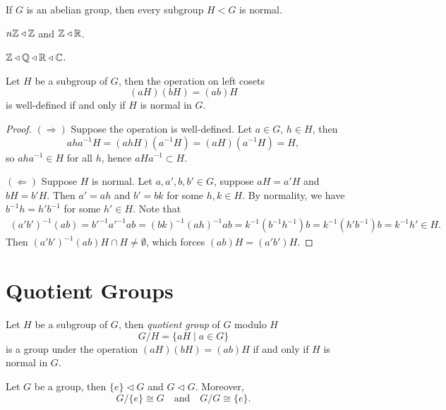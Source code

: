 \begin{proposition}
  If \(G\) is an abelian group, then every subgroup \(H < G\) is normal.
\end{proposition}

\begin{example}
  \(n\mathbb{Z}\triangleleft\mathbb{Z}\) and \(\mathbb{Z}\triangleleft\mathbb{R}\).
\end{example}

\begin{example}
  \(\mathbb{Z}\triangleleft\mathbb{Q}\triangleleft\mathbb{R}\triangleleft\mathbb{C}\).
\end{example}

\begin{theorem}
  Let \(H\) be a subgroup of \(G\), then the operation on left cosets \[
    (aH)(bH) = (ab)H
  \] is well-defined if and only if \(H\) is normal in \(G\).
\end{theorem}
\begin{proof}
  \((\Rightarrow)\) Suppose the operation is well-defined. Let \(a\in G\), \(h\in H\), then \[
    aha^{-1}H = (ahH)(a^{-1}H)
    = (aH)(a^{-1}H) = H,
  \] so \(aha^{-1}\in H\) for all \(h\), hence \(aHa^{-1}\subset H\).

  \((\Leftarrow)\) Suppose \(H\) is normal. Let \(a,a',b,b'\in G\), suppose \(aH = a'H\) and \(bH = b'H\). 
  Then \(a' = ah\) and \(b' = bk\) for some \(h,k\in H\).
  By normality, we have \(b^{-1}h = h'b^{-1}\) for some \(h'\in H\).
  Note that \begin{align*}
    (a'b')^{-1}(ab)
    = b'^{-1}a'^{-1}ab
    = (bk)^{-1}(ah)^{-1}ab
    = k^{-1}(b^{-1}h^{-1})b
    = k^{-1}(h'b^{-1})b
    = k^{-1}h' \in H.
  \end{align*}
  Then \((a'b')^{-1}(ab)H\cap H\neq \emptyset\), which forces \((ab)H = (a'b')H\).
\end{proof}

\section{Quotient Groups}

\begin{corollary}
  Let \(H\) be a subgroup of \(G\), then \emph{quotient group} of \(G\) modulo \(H\) \[
    G/H = \{aH \mid a\in G\}
  \]
  is a group under the operation \((aH)(bH) = (ab)H\) if and only if \(H\) is normal in \(G\).
\end{corollary}

\begin{example}
  Let \(G\) be a group, then \(\{e\}\lhd G\) and \(G\lhd G\). Moreover, \[
    G/\{e\} \cong G \quad\text{and}\quad G/G \cong \{e\}.
  \]
\end{example}

